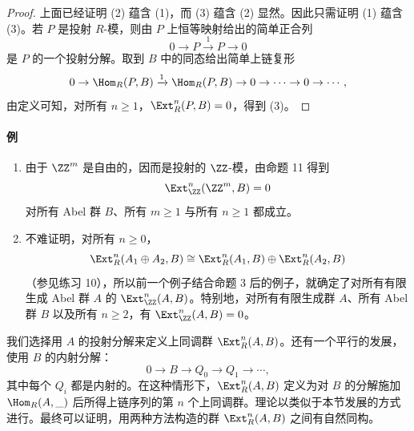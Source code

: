 \begin{proof}
上面已经证明 (2) 蕴含 (1)，而 (3) 蕴含 (2) 显然。因此只需证明 (1) 蕴含 (3)。若 $P$ 是投射 $R$-模，则由 $P$ 上恒等映射给出的简单正合列
\[
  0\to P\xrightarrow{1}P\to0
\]
是 $P$ 的一个投射分解。取到 $B$ 中的同态给出简单上链复形
\[
  0\to\Hom_R(P,B)\xrightarrow{1}\Hom_R(P,B)\to0\to\cdots\to0\to\cdots,
\]
由定义可知，对所有 $n\geq1$，$\Ext_R^n(P,B)=0$，得到 (3)。
\end{proof}

\paragraph{例}
\begin{enumerate}[label=(\arabic*)]
  \item 由于 $\ZZ^m$ 是自由的，因而是投射的 $\ZZ$-模，由命题 11 得到
  \[
    \Ext_{\ZZ}^n(\ZZ^m,B)=0
  \]
  对所有 Abel 群 $B$、所有 $m\geq1$ 与所有 $n\geq1$ 都成立。
  \item 不难证明，对所有 $n\geq0$，
  \[
    \Ext_R^n(A_1\oplus A_2,B)\cong\Ext_R^n(A_1,B)\oplus\Ext_R^n(A_2,B)
  \]
  （参见练习 10），所以前一个例子结合命题 3 后的例子，就确定了对所有有限生成 Abel 群 $A$ 的 $\Ext_{\ZZ}^n(A,B)$。特别地，对所有有限生成群 $A$、所有 Abel 群 $B$ 以及所有 $n\geq2$，有 $\Ext_{\ZZ}^n(A,B)=0$。
\end{enumerate}

我们选择用 $A$ 的投射分解来定义上同调群 $\Ext_R^n(A,B)$。还有一个平行的发展，使用 $B$ 的内射分解：
\[
  0\to B\to Q_0\to Q_1\to\cdots,
\]
其中每个 $Q_i$ 都是内射的。在这种情形下，$\Ext_R^n(A,B)$ 定义为对 $B$ 的分解施加 $\Hom_R(A,\_)$ 后所得上链序列的第 $n$ 个上同调群。理论以类似于本节发展的方式进行。最终可以证明，用两种方法构造的群 $\Ext_R^n(A,B)$ 之间有自然同构。

